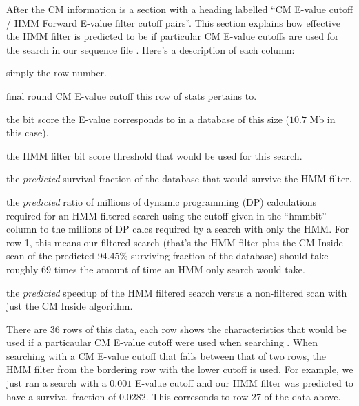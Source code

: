 After the CM information is a section with a heading labelled ``CM 
E-value cutoff / HMM Forward E-value filter cutoff pairs''. This
section explains how effective the HMM filter is predicted to be if
particular CM E-value cutoffs are used for the search in our sequence file
. Here's a description of each column:
\begin{wideitem}

\item[\emprog{idx}] simply the row number.

\item[\emprog{cm E}] final round CM E-value cutoff this row of stats pertains
  to.

\item[\emprog{cm bit}] the bit score the E-value corresponds to in a
  database of this size ($10.7$ Mb in this case).

\item[\emprog{hmm bit}] the HMM filter bit score threshold that would
  be used for this search.

\item[\emprog{surv}] the \textit{predicted} survival fraction of the database
  that would survive the HMM filter.

\item[\emprog{xhmm}] the \emph{predicted} ratio of millions of dynamic programming (DP)
  calculations required for an HMM filtered search using the cutoff
  given in the ``hmmbit'' column to the millions of DP calcs required
  by a search with only the HMM. For row 1, this means our filtered search
  (that's the HMM filter plus the CM Inside scan of the predicted
  94.45\% surviving fraction of the database) should take
  roughly 69 times the amount of time an HMM only search would take.
  
\item[\emprog{speedup}] the \textit{predicted} speedup of the HMM filtered
  search versus a non-filtered scan with just the CM Inside algorithm.

\end{wideitem}

There are 36 rows of this data, each row shows the characteristics
that would be used if a particaular CM E-value cutoff were used when
searching . When searching with a
CM E-value cutoff that falls between that of two rows, the HMM filter
from the bordering row with the lower cutoff is used. For example, we
just ran a search with a $0.001$ E-value cutoff and our HMM filter was
predicted to have a survival fraction of $0.0282$. This corresonds to
row 27 of the data above. 

